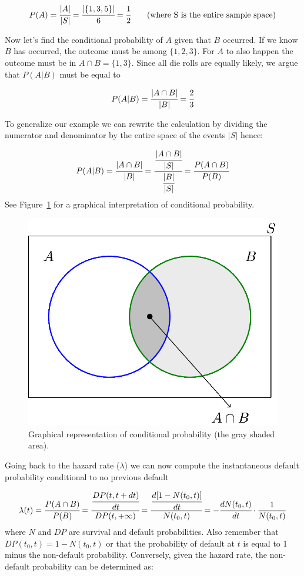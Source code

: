 \begin{equation}
P(A) = \cfrac{|A|}{|S|} = \cfrac{|\{1,3,5\}|}{6} = \cfrac{1}{2}\qquad\textrm{(where S is the entire sample space)}
\end{equation}

Now let's find the conditional probability of \(A\) given that \(B\) occurred. If we know \(B\) has occurred, the outcome must be among \(\{1,2,3\}\). For \(A\) to also happen the outcome must be in \(A\cap B = \{1,3\}\). Since all die rolls are equally likely, we argue that \(P(A|B)\) must be equal to

\begin{equation}
P(A|B) = \cfrac{|A\cap B|}{|B|} = \cfrac{2}{3}
\end{equation}

To generalize our example we can rewrite the calculation by dividing the numerator and denominator by the entire space of the events \(|S|\) hence:

\begin{equation}
P(A|B) = \cfrac{|A\cap B|}{|B|} = \cfrac{\cfrac{|A\cap B|}{|S|}}{\cfrac{|B|}{|S|}} = \cfrac{P(A\cap B)}{P(B)}
\end{equation}
See Figure~\ref{fig:conditional_prob} for a graphical interpretation of conditional probability.

\begin{figure}[tb]
\centering
\includegraphics[width=0.5\linewidth]{figures/conditional_b}
\caption{Graphical representation of conditional probability (the gray shaded area).}
\label{fig:conditional_prob}
\end{figure}

Going back to the hazard rate ($\lambda$) we can now compute the instantaneous default probability conditional to no previous default 

\begin{equation}
\lambda(t) = \cfrac{P(A\cap B)}{P(B)} = \cfrac{\cfrac{DP(t, t+dt)}{dt}}{DP(t, +\infty)} = \cfrac{\cfrac{d[1-N(t_0, t)]}{dt}}{N(t_0, t)} = -\cfrac{dN(t_0, t)}{dt}\cdot\frac{1}{N(t_0, t)}
\end{equation}
where $N$ and $DP$ are survival and default probabilities.
Also remember that $DP(t_0, t) = 1 - N(t_0, t)$ or that the probability of default at $t$ is equal to 1 minus the non-default probability. Conversely, given the hazard rate, the non-default probability can be determined as:

